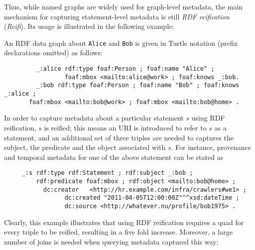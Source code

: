 Thus, while named graphs are widely used for graph-level metadata, the main mechanism for capturing statement-level metadata is still \emph{RDF reification}~\cite{Klyne04:RDFconcepts,Hayes04:RDFsemantics} (\emph{Reifi}). Its usage is illustrated in the following example:

\begin{example}
An RDF data graph about \verb+Alice+ and \verb+Bob+ is given in Turtle notation (prefix declarations omitted) as follows:

	\begin{footnotesize}%
	\begin{verbatim}
		 _:alice rdf:type foaf:Person ; foaf:name "Alice" ; 
		         foaf:mbox <mailto:alice@work> ; foaf:knows _:bob.
		 _:bob rdf:type foaf:Person ; foaf:name "Bob" ; foaf:knows _:alice ;
       foaf:mbox <mailto:bob@work> ; foaf:mbox <mailto:bob@home> .
	\end{verbatim}%
	\end{footnotesize}
In order to capture metadata about a particular statement $s$ using RDF reification, $s$ is reified; this means an URI is introduced to refer to $s$ as a statement, and an additional set of three triples are needed to captures the subject, the predicate and the object associated with $s$. For instance, provenance and temporal metadata for one of the above statement can be stated as 
  \begin{footnotesize}%
	\begin{verbatim}
	 _:s rdf:type rdf:Statement ; rdf:subject _:bob ; 
	     rdf:predicate foaf:mbox ; rdf:object <mailto:bob@home> ; 
	 	   dc:creator	<http://hr.example.com/infra/crawlers#we1> ;
			     dc:created "2011-04-05T12:00:00Z"^^xsd:dateTime ; 
			     dc:source <http://whatever.nu/profile/bob1975> .
	\end{verbatim}%
	\end{footnotesize}
\end{example}


Clearly, this example illustrates that using RDF reification requires a
quad for every triple to be reified, resulting in a five fold increase. Moreover, a large number of joins is needed when querying metadata captured this way:   

